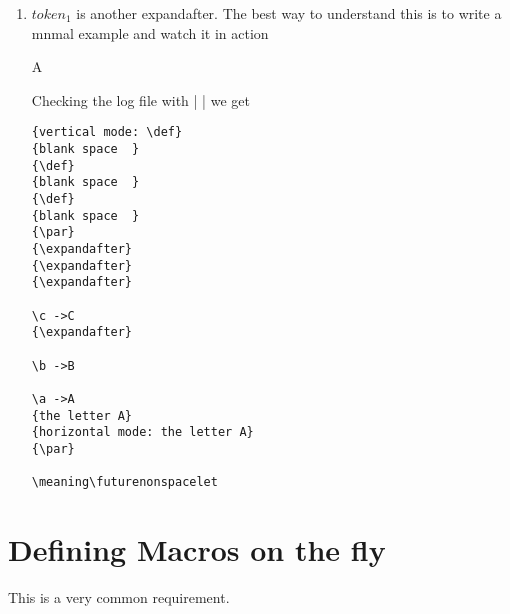 \begin{enumerate}
\begin{enumerate}
\def\a{A}
\def\b{B}
\def\c{C}
\newtoks\ta
\newtoks\tb
\ta = {\a\b\c}
\tb=\expandafter{\the\ta}
\tb={\the\ta}

\texttt{> \the\tb}

\texttt{> \the\ta}

\endgroup


\item $token_1$ is another expandafter. The best way to understand this is to write a \tex mnmal example and watch it in action

\begin{teX}
  
\def\a{A}
\def\b{B}
\def\c{C}

\expandafter\expandafter\expandafter\a\expandafter\b\c

\bye
\end{teX}

Checking the log file with | | we get

\begin{verbatim}
{vertical mode: \def}
{blank space  }
{\def}
{blank space  }
{\def}
{blank space  }
{\par}
{\expandafter}
{\expandafter}
{\expandafter}

\c ->C
{\expandafter}

\b ->B

\a ->A
{the letter A}
{horizontal mode: the letter A}
{\par}

\meaning\futurenonspacelet
\end{verbatim}


\end{enumerate}


\section{Defining Macros on the fly}

This is a very common requirement. 


\newcommand\newacro[2]{
\expandafter\gdef\csname humanize#1\endcsname{#2}%
}






\end{enumerate}









